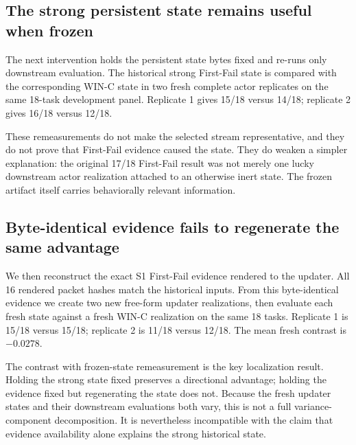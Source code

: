 \subsection{The strong persistent state remains useful when frozen}
The next intervention holds the persistent state bytes fixed and re-runs only downstream evaluation. The historical strong First-Fail state is compared with the corresponding WIN-C state in two fresh complete actor replicates on the same 18-task development panel. Replicate 1 gives 15/18 versus 14/18; replicate 2 gives 16/18 versus 12/18.

These remeasurements do not make the selected stream representative, and they do not prove that First-Fail evidence caused the state. They do weaken a simpler explanation: the original 17/18 First-Fail result was not merely one lucky downstream actor realization attached to an otherwise inert state. The frozen artifact itself carries behaviorally relevant information.

\subsection{Byte-identical evidence fails to regenerate the same advantage}
We then reconstruct the exact S1 First-Fail evidence rendered to the updater. All 16 rendered packet hashes match the historical inputs. From this byte-identical evidence we create two new free-form updater realizations, then evaluate each fresh state against a fresh WIN-C realization on the same 18 tasks. Replicate 1 is 15/18 versus 15/18; replicate 2 is 11/18 versus 12/18. The mean fresh contrast is $-0.0278$.

The contrast with frozen-state remeasurement is the key localization result. Holding the strong state fixed preserves a directional advantage; holding the evidence fixed but regenerating the state does not. Because the fresh updater states and their downstream evaluations both vary, this is not a full variance-component decomposition. It is nevertheless incompatible with the claim that evidence availability alone explains the strong historical state.

